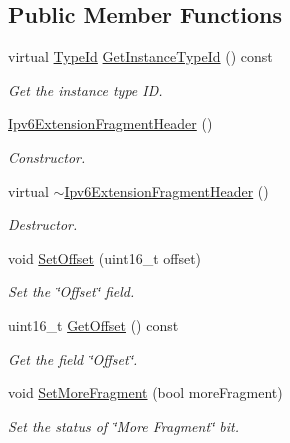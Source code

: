 \subsection*{Public Member Functions}
\begin{DoxyCompactItemize}
\item 
virtual \hyperlink{classns3_1_1TypeId}{Type\+Id} \hyperlink{classns3_1_1Ipv6ExtensionFragmentHeader_a7e69b7a3654611687341b127568229d1}{Get\+Instance\+Type\+Id} () const 
\begin{DoxyCompactList}\small\item\em Get the instance type ID. \end{DoxyCompactList}\item 
\hyperlink{classns3_1_1Ipv6ExtensionFragmentHeader_a21055e1fc8ee7b374858a624d65650b1}{Ipv6\+Extension\+Fragment\+Header} ()
\begin{DoxyCompactList}\small\item\em Constructor. \end{DoxyCompactList}\item 
virtual \hyperlink{classns3_1_1Ipv6ExtensionFragmentHeader_a8d8c049721045cb6075e7ec0b9b87d29}{$\sim$\+Ipv6\+Extension\+Fragment\+Header} ()
\begin{DoxyCompactList}\small\item\em Destructor. \end{DoxyCompactList}\item 
void \hyperlink{classns3_1_1Ipv6ExtensionFragmentHeader_a3241278146df873f4fc7dfe2baf10592}{Set\+Offset} (uint16\+\_\+t offset)
\begin{DoxyCompactList}\small\item\em Set the \char`\"{}\+Offset\char`\"{} field. \end{DoxyCompactList}\item 
uint16\+\_\+t \hyperlink{classns3_1_1Ipv6ExtensionFragmentHeader_a4cc5a13e507671dfd781c95cb1b20eae}{Get\+Offset} () const 
\begin{DoxyCompactList}\small\item\em Get the field \char`\"{}\+Offset\char`\"{}. \end{DoxyCompactList}\item 
void \hyperlink{classns3_1_1Ipv6ExtensionFragmentHeader_ab74b6842274a8999d22ffa7f6c633af3}{Set\+More\+Fragment} (bool more\+Fragment)
\begin{DoxyCompactList}\small\item\em Set the status of \char`\"{}\+More Fragment\char`\"{} bit. \end{DoxyCompactList}\item 

\end{DoxyCompactItemize}
